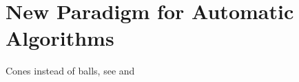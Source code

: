 \section{New Paradigm for Automatic Algorithms}
Cones instead of balls, see \cite{HicEtal14a} and \cite{HicEtal14b}